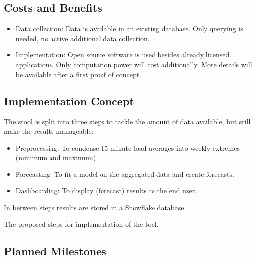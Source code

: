\documentclass[letterpaper,10pt,english]{sphinxmanual}
\let\sphinxpxdimen\pdfpxdimen\else\newdimen\sphinxpxdimen
\begin{document}
\subsection{Costs and Benefits}
\label{\detokenize{business_understanding:costs-and-benefits}}\begin{itemize}
\item {} 
Data collection: Data is available in an existing database. Only querying is needed, no active additional data collection.

\item {} 
Implementation: Open source software is used besides already licensed applications. Only computation power will cost additionally. More details will be available after a first proof of concept.

\end{itemize}


\subsection{Implementation Concept}
\label{\detokenize{business_understanding:implementation-concept}}
The stool is split into three steps to tackle the amount of data available, but still make the results manageable:
\begin{itemize}
\item {} 
Preprocessing: To condense 15 minute load averages into weekly extremes (minimum and maximum).

\item {} 
Forecasting: To fit a model on the aggregated data and create forecasts.

\item {} 
Dashboarding: To display (forecast) results to the end user.

\end{itemize}

In between steps results are stored in a Snowflake database.

\noindent{\hspace*{\fill}\sphinxincludegraphics[width=800\sphinxpxdimen]{{process_steps}.png}\hspace*{\fill}}

The proposed steps for implementation of the tool.


\subsection{Planned Milestones}
\label{\detokenize{business_understanding:planned-milestones}}
\end{document}
